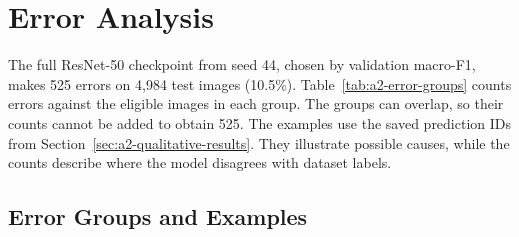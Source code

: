\clearpage
\section{Error Analysis}
\label{sec:a2-error-analysis}

The full ResNet-50 checkpoint from seed 44, chosen by validation macro-F1, makes 525 errors on 4,984 test images (10.5\%). Table~\ref{tab:a2-error-groups} counts errors against the eligible images in each group. The groups can overlap, so their counts cannot be added to obtain 525. The examples use the saved prediction IDs from Section~\ref{sec:a2-qualitative-results}. They illustrate possible causes, while the counts describe where the model disagrees with dataset labels.

\subsection{Error Groups and Examples}

